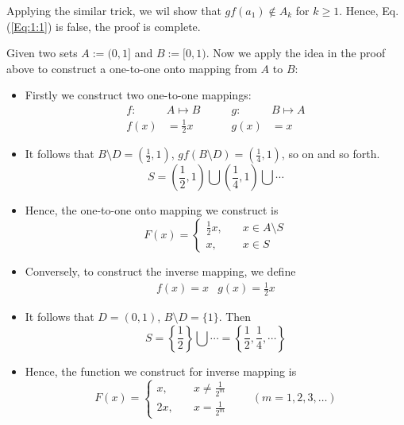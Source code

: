 Applying the similar trick, we wil show that $gf(a_1)\notin A_k$ for $k\ge 1$. Hence, Eq.(\ref{Eq:1:1}) is false, the proof is complete.
\begin{example}
Given two sets $A:=(0,1]$ and $B:=[0,1)$. Now we apply the idea in the proof above to construct a one-to-one onto mapping from $A$ to $B$:
\begin{itemize}
\item
Firstly we construct two one-to-one mappings:
\[
\begin{aligned}
f:&A\mapsto B\\
f(x)&=\frac{1}{2}x
\end{aligned}
\qquad
\begin{aligned}
g:&B\mapsto A\\
g(x)&=x
\end{aligned}
\]
\item
It follows that $B\setminus D=(\frac{1}{2},1)$, $gf(B\setminus D)=(\frac{1}{4},1)$, so on and so forth.
\[
S=(\frac{1}{2},1)\bigcup (\frac{1}{4},1)\bigcup\cdots
\]
\item
Hence, the one-to-one onto mapping we construct is
\[
F(x)=\left\{
\begin{aligned}
\frac{1}{2}x,&\quad x\in A\setminus S\\
x,&\quad x\in S
\end{aligned}
\right.
\]
\item
Conversely, to construct the inverse mapping, we define
\[
\begin{array}{ll}
f(x)=x
&
g(x)=\frac{1}{2}x
\end{array}
\]
\item
It follows that $D=(0,1)$, $B\setminus D=\{1\}$. Then
\[
S=\left\{\frac{1}{2}\right\}\bigcup\cdots=\left\{\frac{1}{2},\frac{1}{4},\cdots\right\}
\]
\item
Hence, the function we construct for inverse mapping is
\[
F(x)=\left\{
\begin{aligned}
x,&\quad x\ne\frac{1}{2^m}\\
2x,&\quad x=\frac{1}{2^m}
\end{aligned}
\right.
\qquad
(m=1,2,3,\dots)
\]
\end{itemize}
\end{example}
